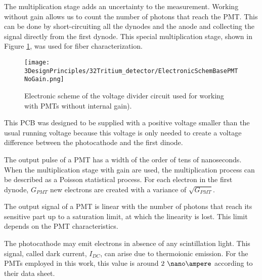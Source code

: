 \begin{enumerate}
The multiplication stage adds an uncertainty to the measurement. Working without gain allows us to count the number of photons that reach the PMT. This can be done by short-circuiting all the dynodes and the anode and collecting the signal directly from the first dynode. This special multiplication stage, shown in Figure \ref{fig:ElectronicSchemeBasePMTNoGain}, was used for fiber characterization.

\begin{figure}[htbp]
\centering
\texttt{[image: 3DesignPrinciples/32Tritium\_detector/ElectronicSchemBasePMTNoGain.png]}
\caption{Electronic scheme of the voltage divider circuit used for working with PMTs without internal gain).\label{fig:ElectronicSchemeBasePMTNoGain}}
\end{figure}

This PCB was designed to be supplied with a positive voltage smaller than the usual running voltage because this voltage is only needed to create a voltage difference between the photocathode and the first dinode. 

\end{enumerate}

The output pulse of a PMT has a width of the order of tens of nanoseconds. When the multiplication stage with gain are used, the multiplication process can be described as a Poisson statistical process. For each electron in the first dynode, $G_{PMT}$ new electrons are created with a variance of $\sqrt{G_{PMT}}$.

The output signal of a PMT is linear with the number of photons that reach its sensitive part up to a saturation limit, at which the linearity is lost. This limit depends on the PMT characteristics.

The photocathode may emit electrons in absence of any scintillation light. This signal, called dark current, $I_{DC}$, can  arise due to thermoionic emission. For the PMTs employed in this work, this value is around $2~\nano\ampere$ according to their data sheet.

